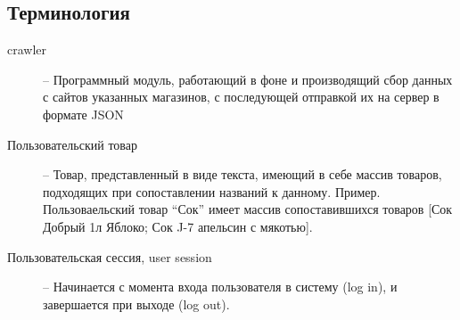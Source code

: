 \subsection{Терминология}
\begin{description}
    \item[crawler] --
            Программный модуль, работающий в фоне и производящий сбор данных с сайтов
            указанных магазинов, с последующей отправкой их на сервер в формате
            JSON
    \item[Пользовательский товар] --
            Товар, представленный в виде текста, имеющий в себе массив товаров,
            подходящих при сопоставлении названий к данному. Пример.
            Пользоваельский товар ``Сок'' имеет массив сопоставившихся товаров [Сок
            Добрый 1л Яблоко; Сок J-7 апельсин с мякотью].
    \item[Пользовательская сессия, user session] --
           Начинается с момента входа пользователя в систему (log in), и завершается при выходе (log out).
\end{description}

